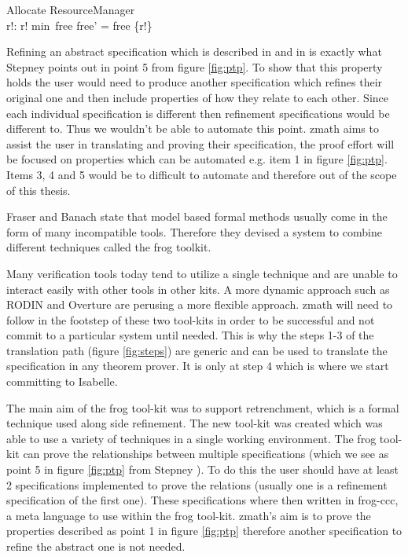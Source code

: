 \begin{exam}

\begin{schema}{Allocate}
\Delta ResourceManager \\
r!: \nat
\where
r! \in min~free \land free' = free \setminus \{r!\}
\end{schema}
\label{exam:allocaterefine} 
\end{exam}

Refining an abstract specification which is described in
\cite{Woodcock:1996:UZS:235337} and in \cite{spiveyreferencemanual} is exactly
what Stepney points out in point 5 from figure \ref{fig:ptp}. To show that this
property holds the user would need to produce another specification which
refines their original one and then include properties of how they relate to
each other. Since each individual specification is different then refinement
specifications would be different to. Thus we wouldn't be able to automate this
point. \gls{zmath} aims to assist the user in translating and proving their
specification, the proof effort will be focused on properties which can be
automated e.g. item 1 in figure \ref{fig:ptp}. Items 3, 4 and 5 would be to
difficult to automate and therefore out of the scope of this thesis.

Fraser and Banach \cite{DBLP:conf/sefm/FraserB07} state that model based formal
methods usually come in the form of many incompatible tools. Therefore they
devised a system to combine different techniques called the frog toolkit.

Many verification tools today tend to utilize a single technique and are unable
to interact easily with other tools in other kits. A more dynamic approach such
as RODIN \cite{Jones05j} and Overture \cite{overture} are perusing a more
flexible approach. \gls{zmath} will need to follow in the footstep of these two
tool-kits in order to be successful and not commit to a particular system until
needed. This is why the steps 1-3 of the translation path (figure
\ref{fig:steps}) are generic and can be used to translate the specification in
any theorem prover. It is only at step 4 which is where we start committing to
Isabelle.

The main aim of the frog tool-kit was to support retrenchment, which is a formal
technique used along side refinement. The new tool-kit was created which was
able to use a variety of techniques in a single working environment. The frog
tool-kit can prove the relationships between multiple specifications (which we
see as point 5 in figure \ref{fig:ptp} from Stepney \cite{stepney1998tale}). To
do this the user should have at least 2 specifications implemented to prove the
relations (usually one is a refinement specification of the first one). These
specifications where then written in frog-ccc, a meta language to use within the
frog tool-kit. \gls{zmath}'s aim is to prove the properties described as point 1
in figure \ref{fig:ptp} therefore another specification to refine the abstract
one is not needed.

